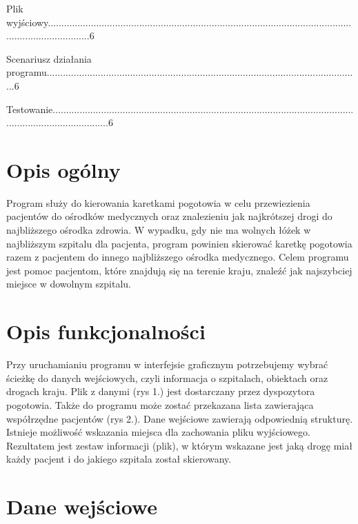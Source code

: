 ﻿\documentclass{article}
\begin{document}
\noindent Plik wyj\'{s}ciowy................................................................................................................................................6

\noindent Scenariusz dzia{\l}ania programu.....................................................................................................................6

\noindent Testowanie......................................................................................................................................................6 

\eject

\noindent 
\section{Opis og\'{o}lny}

\noindent Program s{\l}u\.{z}y do kierowania karetkami pogotowia w celu przewiezienia pacjent\'{o}w do o\'{s}rodk\'{o}w medycznych oraz znalezieniu jak najkr\'{o}tszej drogi do najbli\.{z}szego o\'{s}rodka zdrowia. W wypadku, gdy nie ma wolnych {\l}\'{o}\.{z}ek w najbli\.{z}szym szpitalu dla pacjenta, program powinien skierowa\'{c} karetk\k{e} pogotowia razem z pacjentem do innego najbli\.{z}szego o\'{s}rodka medycznego. Celem programu jest pomoc pacjentom, kt\'{o}re znajduj\k{a} si\k{e} na terenie kraju, znale\'{z}\'{c} jak najszybciej miejsce w dowolnym szpitalu.

\noindent 
\section{Opis funkcjonalno\'{s}ci}

\noindent Przy uruchamianiu programu w interfejsie graficznym potrzebujemy wybra\'{c} \'{s}cie\.{z}k\k{e} do danych wej\'{s}ciowych, czyli informacja o szpitalach, obiektach oraz drogach kraju. Plik z danymi (rys 1.) jest dostarczany przez dyspozytora pogotowia. Tak\.{z}e do programu mo\.{z}e zosta\'{c} przekazana lista zawieraj\k{a}ca wsp\'{o}{\l}rz\k{e}dne pacjent\'{o}w (rys 2.). Dane wej\'{s}ciowe zawieraj\k{a} odpowiedni\k{a} struktur\k{e}. Istnieje mo\.{z}liwo\'{s}\'{c} wskazania miejsca dla zachowania pliku wyj\'{s}ciowego. Rezultatem jest zestaw informacji (plik), w kt\'{o}rym wskazane jest jak\k{a} drog\k{e} mia{\l} ka\.{z}dy pacjent i do jakiego szpitala zosta{\l} skierowany.

\noindent 
\section{Dane wej\'{s}ciowe}
\end{document}
